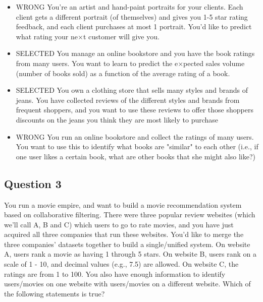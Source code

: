 \documentclass[11pt]{article} %
\begin{document}
\begin{itemize}
\item WRONG You're an artist and hand-paint portraits for your clients. Each client gets a different portrait (of themselves) and gives you 1-5 star rating feedback, and each client purchases at most 1 portrait. You'd like to predict what rating your ne$ \times $t customer will give you.

\item SELECTED You manage an online bookstore and you have the book ratings from many users. You want to learn to predict the e$ \times $pected sales volume (number of books sold) as a function of the average rating of a book.

\item SELECTED You own a clothing store that sells many styles and brands of jeans. You have collected reviews of the different styles and brands from frequent shoppers, and you want to use these reviews to offer those shoppers discounts on the jeans you think they are most likely to purchase

\item WRONG You run an online bookstore and collect the ratings of many users. You want to use this to identify what books are "similar" to each other (i.e., if one user likes a certain book, what are other books that she might also like?)
\end{itemize}
\subsection*{Question 3 }  

You run a movie empire, and want to build a movie recommendation system based on collaborative filtering. There were three popular review websites (which we'll call A, B and C) which users to go to rate movies, and you have just acquired all three companies that run these websites. You'd like to merge the three companies' datasets together to build a single/unified system. On website A, users rank a movie as having 1 through 5 stars. On website B, users rank on a scale of 1 - 10, and decimal values (e.g., 7.5) are allowed. On website C, the ratings are from 1 to 100. You also have enough information to identify users/movies on one website with users/movies on a different website. Which of the following statements is true?
\end{document}
